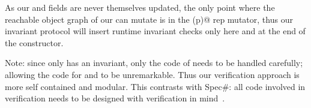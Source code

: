 As our \Q@path@ and \Q@h@ fields are never themselves updated, the only point where the reachable object graph of our \Q@Cage@ can mutate is in the \Q@moveTo(p)@ rep mutator, thus 
our invariant protocol will insert runtime invariant checks only here and at the end of the constructor.

\begin{comment}
We use the \Q@read@ annotation on the \Q@equals(that)@ method to express that it does not modify either its
receiver or its parameter. In \Q@Cage@ we use 
the \Q@capsule@ annotation to ensure
that the modification of the \Q@Hamster@'s reachable object graph is fully under the control
of the containing \Q@Cage@. 
We annotated the \Q@move()@
and \Q@moveTo(p)@ methods with \Q@mut@, since they modify
their receivers' reachable object graph. The default annotation is \Q@imm@, thus \Q@Cage@'s \Q@path@ field is a deeply immutable list of \Q@Point@s.
Our system performs runtime checks for the invariant
at the end of \Q@Cage@'s constructor, \Q@moveTo(p)@ method, and after any update to one of its fields.
The \Q@moveTo(p)@ method is the only one that may (directly) break the \Q@Cage@'s invariant. However, there is only a single occurrence of \Q@this@ and it is used to read the \Q@h@ field. We use the guarantees of reference capabilities to ensure that no alias to \Q@this@ could be reachable from either \Q@h@ or the immutable \Q@Point@ parameter. Thus, the potentially broken \Q@this@ object is not visible while the \Q@Hamster@'s position is updated. 
The invariant is checked at the end of the \Q@moveTo(p)@ method, just before \Q@this@ would become visible again.
This technique loosely corresponds to an implicit pack and unpack: we `unpack' \Q@this@ before reading the field, then we work on the field's value while the invariant of \Q@this@ is not known to hold, finally when returning, we `pack' \Q!this! and check its invariant before allowing it to be used again.
\end{comment}

Note: since only \Q@Cage@ has an invariant,
 only the code of \Q@Cage@ needs to be handled carefully; allowing the code for \Q@Point@ and \Q@Hamster@ to be unremarkable.
Thus our verification approach is more self contained and modular.
 This contrasts with Spec\#: all code involved in  verification needs to be designed with verification in mind~\cite{barnett2011specification}.

